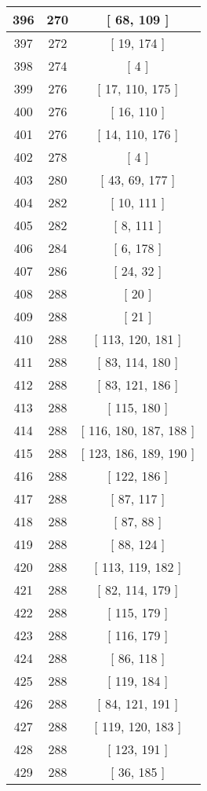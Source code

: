 \begin{center}
\begin{longtable}[H]{|| c c c ||}
\hline
396 & 270 & [ 68, 109 ] \\ 
\hline
397 & 272 & [ 19, 174 ] \\ 
\hline
398 & 274 & [ 4 ] \\ 
\hline
399 & 276 & [ 17, 110, 175 ] \\ 
\hline
400 & 276 & [ 16, 110 ] \\ 
\hline
401 & 276 & [ 14, 110, 176 ] \\ 
\hline
402 & 278 & [ 4 ] \\ 
\hline
403 & 280 & [ 43, 69, 177 ] \\ 
\hline
404 & 282 & [ 10, 111 ] \\ 
\hline
405 & 282 & [ 8, 111 ] \\ 
\hline
406 & 284 & [ 6, 178 ] \\ 
\hline
407 & 286 & [ 24, 32 ] \\ 
\hline
408 & 288 & [ 20 ] \\ 
\hline
409 & 288 & [ 21 ] \\ 
\hline
410 & 288 & [ 113, 120, 181 ] \\ 
\hline
411 & 288 & [ 83, 114, 180 ] \\ 
\hline
412 & 288 & [ 83, 121, 186 ] \\ 
\hline
413 & 288 & [ 115, 180 ] \\ 
\hline
414 & 288 & [ 116, 180, 187, 188 ] \\ 
\hline
415 & 288 & [ 123, 186, 189, 190 ] \\ 
\hline
416 & 288 & [ 122, 186 ] \\ 
\hline
417 & 288 & [ 87, 117 ] \\ 
\hline
418 & 288 & [ 87, 88 ] \\ 
\hline
419 & 288 & [ 88, 124 ] \\ 
\hline
420 & 288 & [ 113, 119, 182 ] \\ 
\hline
421 & 288 & [ 82, 114, 179 ] \\ 
\hline
422 & 288 & [ 115, 179 ] \\ 
\hline
423 & 288 & [ 116, 179 ] \\ 
\hline
424 & 288 & [ 86, 118 ] \\ 
\hline
425 & 288 & [ 119, 184 ] \\ 
\hline
426 & 288 & [ 84, 121, 191 ] \\ 
\hline
427 & 288 & [ 119, 120, 183 ] \\ 
\hline
428 & 288 & [ 123, 191 ] \\ 
\hline
429 & 288 & [ 36, 185 ] \\ 

\end{longtable}
\end{center}
